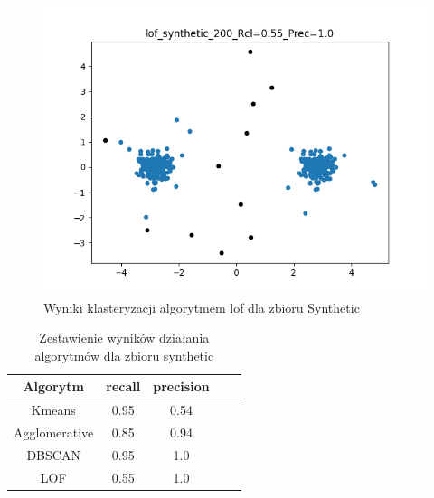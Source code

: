 \documentclass{classrep}
\begin{document}
{{            \begin{figure}[!htbp]
                \centering
                \includegraphics[width=\textwidth]{img/lof_synthetic_200_-115734.png}
                \caption
                {Wyniki klasteryzacji algorytmem lof dla zbioru Synthetic}
                \label{fig:synth_lof}
            \end{figure}
            \FloatBarrier

            \begin{table}[!htbp]
                \centering
                \begin{tabular}{|c|c|c|c|c|}
                    \hline
                    Algorytm & recall & precision \\ \hline
                    Kmeans & 0.95  & 0.54  \\ \hline
                    Agglomerative & 0.85 & 0.94  \\ \hline
                    DBSCAN & 0.95 & 1.0  \\ \hline
                    LOF & 0.55 & 1.0  \\ \hline
                \end{tabular}
                \caption
                {Zestawienie wyników działania algorytmów dla zbioru synthetic}
                \label{tab:synth}
            \end{table}
            \FloatBarrier
        }

    }
\end{document}
